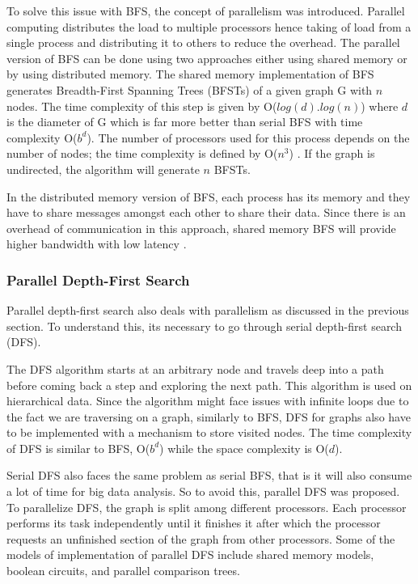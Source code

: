 \documentclass[journal,twoside,web]{ieeecolor}
\begin{document}
To solve this issue with BFS, the concept of parallelism was introduced. Parallel computing distributes the load to multiple processors hence taking of load from a single process and distributing it to others to reduce the overhead. The parallel version of BFS can be done using two approaches either using shared memory or by using distributed memory. The shared memory implementation of BFS generates Breadth-First Spanning Trees (BFSTs) of a given graph G with $n$ nodes. The time complexity of this step is given by O($log(d).log(n)$) where $d$ is the diameter of G which is far more better than serial BFS with time complexity O($b^d$). The number of processors used for this process depends on the number of nodes; the time complexity is defined by O($n^3$) \cite{36}. If the graph is undirected, the algorithm will generate $n$ BFSTs.

In the distributed memory version of BFS, each process has its memory and they have to share messages amongst each other to share their data. Since there is an overhead of communication in this approach, shared memory BFS will provide higher bandwidth with low latency \cite{37}.

\subsubsection{Parallel Depth-First Search}
Parallel depth-first search also deals with parallelism as discussed in the previous section. To understand this, its necessary to go through serial depth-first search (DFS).

The DFS algorithm starts at an arbitrary node and travels deep into a path before coming back a step and exploring the next path. This algorithm is used on hierarchical data. Since the algorithm might face issues with infinite loops due to the fact we are traversing on a graph, similarly to BFS, DFS for graphs also have to be implemented with a mechanism to store visited nodes. The time complexity of DFS is similar to BFS, O($b^d$) while the space complexity is O($d$).

Serial DFS also faces the same problem as serial BFS, that is it will also consume a lot of time for big data analysis. So to avoid this, parallel DFS was proposed. To parallelize DFS, the graph is split among different processors. Each processor performs its task independently until it finishes it after which the processor requests an unfinished section of the graph from other processors. Some of the models of implementation of parallel DFS include shared memory models, boolean circuits, and parallel comparison trees\cite{38}.  
\end{document}
